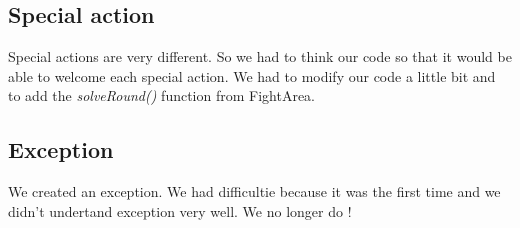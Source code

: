 \subsection{Special action}

Special actions are very different. So we had to think our code so that it would be able to welcome each special action.
We had to modify our code a little bit and to add the \textit{solveRound()} function from FightArea. 

\subsection{Exception}

We created an exception. We had difficultie because it was the first time and we didn't undertand exception very well.
We no longer do !


